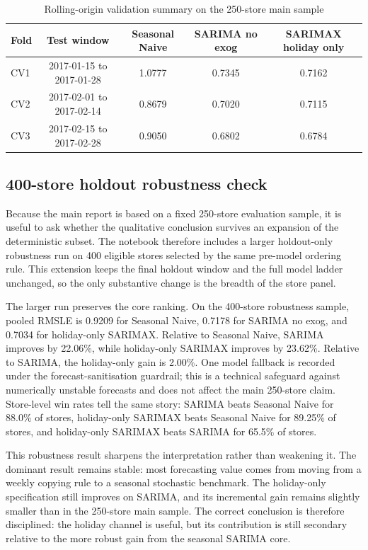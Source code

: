 \documentclass[11pt,oneside]{scrartcl}
\begin{document}
\begin{table}[H]
\centering
\caption{Rolling-origin validation summary on the 250-store main sample}
\begin{tabular}{lcccc}
\toprule
Fold & Test window & Seasonal Naive & SARIMA no exog & SARIMAX holiday only \\
\midrule
CV1 & 2017-01-15 to 2017-01-28 & 1.0777 & 0.7345 & 0.7162 \\
CV2 & 2017-02-01 to 2017-02-14 & 0.8679 & 0.7020 & 0.7115 \\
CV3 & 2017-02-15 to 2017-02-28 & 0.9050 & 0.6802 & 0.6784 \\
\bottomrule
\end{tabular}
\end{table}

\subsection{400-store holdout robustness check}
Because the main report is based on a fixed 250-store evaluation sample, it is useful to ask whether the qualitative conclusion survives an expansion of the deterministic subset. The notebook therefore includes a larger holdout-only robustness run on 400 eligible stores selected by the same pre-model ordering rule. This extension keeps the final holdout window and the full model ladder unchanged, so the only substantive change is the breadth of the store panel.

The larger run preserves the core ranking. On the 400-store robustness sample, pooled RMSLE is 0.9209 for Seasonal Naive, 0.7178 for SARIMA no exog, and 0.7034 for holiday-only SARIMAX. Relative to Seasonal Naive, SARIMA improves by 22.06\%, while holiday-only SARIMAX improves by 23.62\%. Relative to SARIMA, the holiday-only gain is 2.00\%. One model fallback is recorded under the forecast-sanitisation guardrail; this is a technical safeguard against numerically unstable forecasts and does not affect the main 250-store claim. Store-level win rates tell the same story: SARIMA beats Seasonal Naive for 88.0\% of stores, holiday-only SARIMAX beats Seasonal Naive for 89.25\% of stores, and holiday-only SARIMAX beats SARIMA for 65.5\% of stores.

This robustness result sharpens the interpretation rather than weakening it. The dominant result remains stable: most forecasting value comes from moving from a weekly copying rule to a seasonal stochastic benchmark. The holiday-only specification still improves on SARIMA, and its incremental gain remains slightly smaller than in the 250-store main sample. The correct conclusion is therefore disciplined: the holiday channel is useful, but its contribution is still secondary relative to the more robust gain from the seasonal SARIMA core.
\end{document}
